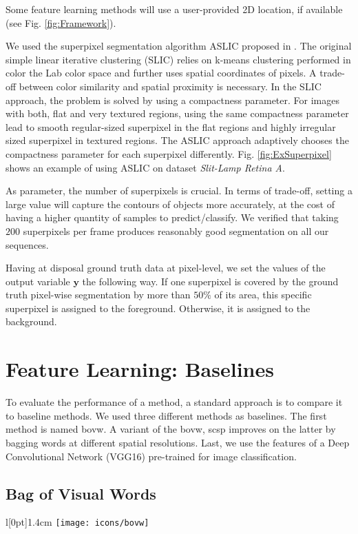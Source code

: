 Some feature learning methods will use a user-provided 2D location, if available (see Fig. \ref{fig:Framework}).

We used the superpixel segmentation algorithm ASLIC proposed in \cite{achanta12}.
The original simple linear iterative clustering (SLIC) relies on k-means clustering performed in color the Lab color space and further uses spatial coordinates of pixels.
A trade-off between color similarity and spatial proximity is necessary.
In the SLIC approach, the problem is solved by using a compactness parameter.
For images with both, flat and very textured regions, using the same compactness parameter lead to smooth regular-sized superpixel in the flat regions and highly irregular sized superpixel in textured regions.
The ASLIC approach adaptively chooses the compactness parameter for each superpixel differently.
Fig. \ref{fig:ExSuperpixel} shows an example of using ASLIC on dataset \textit{Slit-Lamp Retina A}.

As parameter, the number of superpixels is crucial. In terms of trade-off, setting a large value will capture the contours of objects more accurately, at the cost of having a higher quantity of samples to predict/classify. We verified that taking $200$ superpixels per frame produces reasonably good segmentation on all our sequences.

Having at disposal ground truth data at pixel-level, we set the values of the output variable $\boldsymbol{y}$ the following way.
If one superpixel is covered by the ground truth pixel-wise segmentation by more than $50\%$ of its area, this specific superpixel is assigned to the foreground. Otherwise, it is assigned to the background.

\section{Feature Learning: Baselines} \label{ch:baselines}
To evaluate the performance of a method, a standard approach is to compare it to baseline methods.
We used three different methods as baselines.
The first method is named \gls{bovw}.
A variant of the \gls{bovw}, \gls{scsp} improves on the latter by bagging words at different spatial resolutions.
Last, we use the features of a Deep Convolutional Network (VGG16) pre-trained for image classification.

\subsection{Bag of Visual Words} \label{bow}
\begingroup
\setlength\intextsep{0pt}
\begin{wrapfigure}[4]{l}[0pt]{1.4cm}
\texttt{[image: icons/bovw]}
\end{wrapfigure}

